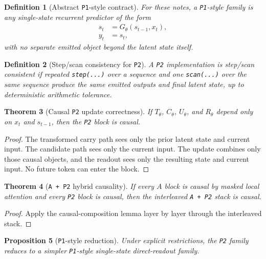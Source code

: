 \documentclass[11pt]{article}
\newtheorem{definition}{Definition}[section]
\newtheorem{theorem}[definition]{Theorem}
\newtheorem{proposition}[definition]{Proposition}
\begin{document}
\begin{definition}[Abstract \texttt{P1}-style contract]
For these notes, a \texttt{P1}-style family is any single-state recurrent
predictor of the form
\begin{align}
  s_t &= G_\theta(s_{t-1}, x_t), \\
  y_t &= s_t,
\end{align}
with no separate emitted object beyond the latent state itself.
\end{definition}

\begin{definition}[Step/scan consistency for \texttt{P2}]
A \texttt{P2} implementation is step/scan consistent if repeated
\texttt{step(...)} over a sequence and one \texttt{scan(...)} over the same
sequence produce the same emitted outputs and final latent state, up to
deterministic arithmetic tolerance.
\end{definition}

\begin{theorem}[Causal \texttt{P2} update correctness]
If $T_\theta$, $C_\theta$, $U_\theta$, and $R_\theta$ depend only on $x_t$ and
$s_{t-1}$, then the \texttt{P2} block is causal.
\end{theorem}

\begin{proof}
The transformed carry path sees only the prior latent state and current input.
The candidate path sees only the current input. The update combines only those
causal objects, and the readout sees only the resulting state and current
input. No future token can enter the block.
\end{proof}

\begin{theorem}[\texttt{A + P2} hybrid causality]
If every $A$ block is causal by masked local attention and every \texttt{P2}
block is causal, then the interleaved \texttt{A + P2} stack is causal.
\end{theorem}

\begin{proof}
Apply the causal-composition lemma layer by layer through the interleaved stack.
\end{proof}

\begin{proposition}[\texttt{P1}-style reduction]
Under explicit restrictions, the \texttt{P2} family reduces to a simpler
\texttt{P1}-style single-state direct-readout family.
\end{proposition}
\end{document}
